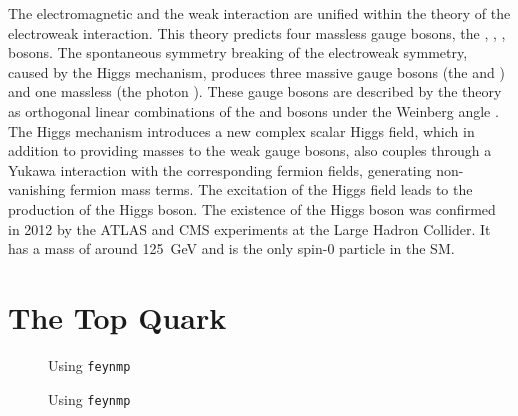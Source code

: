 The electromagnetic and the weak interaction are unified within the theory of the electroweak interaction. This theory predicts four massless gauge bosons, the \PBzero, \PWzero, \PWone, \PWtwo bosons. The spontaneous symmetry breaking of the electroweak symmetry, caused by the Higgs mechanism, produces three massive gauge bosons (the \PZz and \PWpm) and one massless (the photon \Pphoton). These gauge bosons are described by the theory as orthogonal linear combinations of the \PBzero and \PWzero bosons under the Weinberg angle \cite{wiki:electroweak}.\\

The Higgs mechanism introduces a new complex scalar Higgs field, which in addition to providing masses to the weak gauge bosons, also couples through a Yukawa interaction with the corresponding fermion fields, generating non-vanishing fermion mass terms. The excitation of the Higgs field leads to the production of the Higgs boson. The existence of the Higgs boson was confirmed in 2012 by the ATLAS and CMS experiments at the Large Hadron Collider. It has a mass of around \SI{125}{\giga\eV} \cite{Cha12} and is the only spin-0 particle in the SM.

\section{The Top Quark}
\label{sec:theory_top}

\begin{figure}[H]
    \centering
    \begin{subfigure}[b]{0.3\textwidth}
        \centering
        
    \end{subfigure}
    \hfill
    \begin{subfigure}[b]{0.3\textwidth}
        \centering
        
    \end{subfigure}
    \hfill
    \begin{subfigure}[b]{0.3\textwidth}
        \centering
        
    \end{subfigure}
    \caption{Using \texttt{feynmp}}
\end{figure}

\begin{figure}[H]
    \centering
    \begin{subfigure}[b]{0.3\textwidth}
        \centering
        
    \end{subfigure}
    \hfill
    \begin{subfigure}[b]{0.3\textwidth}
        \centering
        
    \end{subfigure}
    \hfill
    \begin{subfigure}[b]{0.3\textwidth}
        \centering
        
    \end{subfigure}
    \caption{Using \texttt{feynmp}}
\end{figure}
